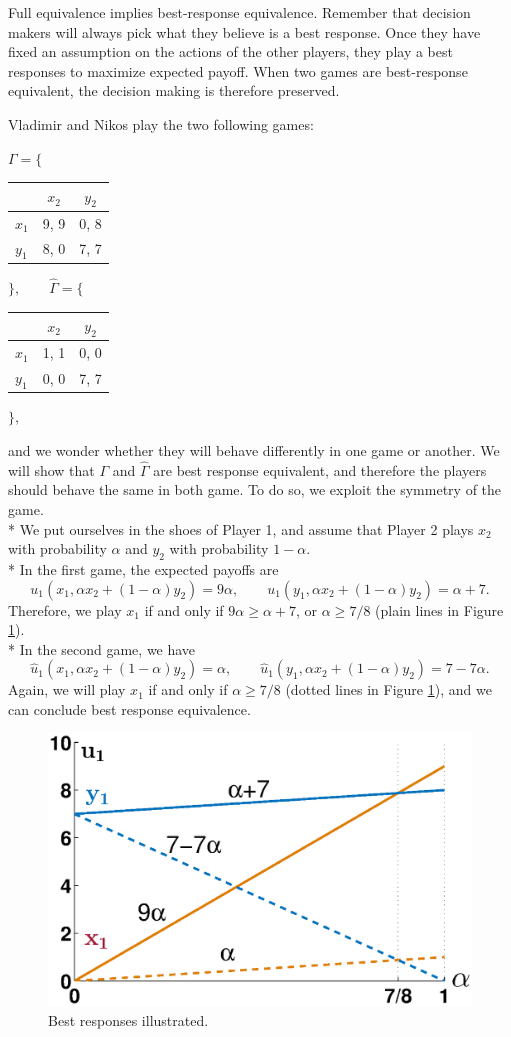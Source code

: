 Full equivalence implies best-response equivalence.
Remember that decision makers will always pick what they believe is a best response. Once they have fixed an assumption on the actions of the other players, they play a best responses to maximize expected payoff.
When two games are best-response equivalent, the decision making is therefore preserved.


\begin{example}
Vladimir and Nikos play the two following games:

\begin{center}
$\Gamma = \Bigg \{ $
\begin{tabular}{l|cc}
 & $x_2$ & $y_2$  \\
\hline
$x_1$ & 9, 9 & 0, 8 \\
$y_1$ & 8, 0 & 7, 7
\end{tabular} $\Bigg \}, \qquad \hat{\Gamma} =  \Bigg \{  $
\begin{tabular}{l|cc}
  & $x_2$ & $y_2$  \\
\hline
$x_1$ & 1, 1 & 0, 0 \\
$y_1$ & 0, 0 & 7, 7
\end{tabular}
$\Bigg \},$
\end{center}
and we wonder whether they will behave differently in one game or another. We will show that $\Gamma$ and $\hat \Gamma$ are best response equivalent, and therefore the players should behave the same in both game. To do so, we exploit the symmetry of the game.\\*
We put ourselves in the shoes of Player 1, and assume that Player 2 plays $x_2$ with probability $\alpha$ and $y_2$ with probability $1-\alpha$.\\*
In the first game, the expected payoffs are
$$u_1(x_1, \alpha x_2 + (1-\alpha) y_2) = 9 \alpha, \qquad u_1(y_1, \alpha x_2 + (1-\alpha) y_2) =  \alpha + 7. $$
Therefore, we play $x_1$ if and only if $9\alpha \geq \alpha + 7$, or $\alpha \geq 7/8$ (plain lines in Figure \ref{chap2:breq}).\\*
In the second game, we have
$$\hat{u}_1(x_1, \alpha x_2 + (1-\alpha) y_2) =  \alpha, \qquad \hat{u}_1(y_1, \alpha x_2 + (1-\alpha) y_2) =   7 - 7\alpha. $$
Again, we will play $x_1$ if and only if $\alpha \geq 7/8$ (dotted lines in Figure \ref{chap2:breq}),
and we can conclude best response equivalence.
\begin{figure}[!ht]
\centering
\includegraphics[width=0.5 \textwidth]{breq.eps}
\caption{Best responses illustrated.}
\label{chap2:breq}
\end{figure}
\end{example}


